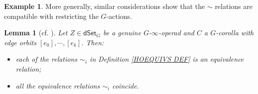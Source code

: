 \documentclass[a4paper,10pt]{article}%
\numberwithin{equation}{section}
\numberwithin{figure}{section}
\newtheorem{lemma}[equation]{Lemma}%
\theoremstyle{definition} %
\newtheorem{example}[equation]{Example}%
\newcommand{\1}{\ensuremath{\mathbbm 1}}%
\begin{document}
\begin{example}
More generally, similar considerations show that the $\sim$ relations are compatible with restricting the $G$-actions.
\end{example}



\begin{lemma}[{cf. \cite[Prop. 6.3 and Lemma 6.4]{MW09}}]
	\label{EQUIVI LEM}
	Let $Z \in \mathsf{dSet}_G$ be a genuine $G$-$\infty$-operad and $C$ a $G$-corolla with edge orbits
	$[e_0],\cdots,[e_k]$. Then:
\begin{itemize}
	\item[(a)] each of the relations $\sim_i$ 
	in Definition \ref{HOEQUIVS DEF}
	is an equivalence relation;
	\item[(b)] all the equivalence relations $\sim_i$ coincide.
\end{itemize}
\end{lemma}
\end{document}
